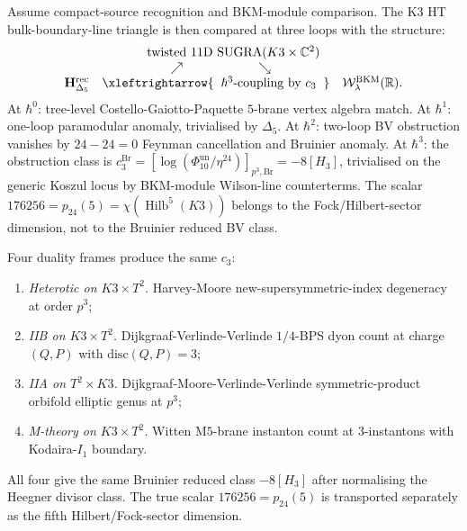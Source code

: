 \begin{remark}
\label{rem:htbb-synthesis}

Assume compact-source recognition and BKM-module comparison. The K3 HT
bulk-boundary-line triangle is then compared at three loops with the
structure:
\[
\begin{array}{c}
 \text{twisted 11D SUGRA}(K3\times\mathbb{C}^2) \\
 \hspace{-2em}\nearrow\qquad\qquad\qquad\searrow \\
 \mathbf{H}_{\Delta_5}^{\mathrm{rec}}
 \quad\xleftrightarrow{\;\;\hbar^3\text{-coupling by }c_3\;\;}\quad
 \mathcal{W}^{\mathrm{BKM}}_\lambda(\mathbb{R}).
\end{array}
\]
At $\hbar^0$: tree-level Costello-Gaiotto-Paquette $5$-brane vertex
algebra match. At $\hbar^1$: one-loop paramodular anomaly,
trivialised by $\Delta_5$. At $\hbar^2$: two-loop BV obstruction
vanishes by $24 - 24 = 0$ Feynman cancellation and Bruinier anomaly.
At $\hbar^3$: the obstruction class is
$c^{\mathrm{Br}}_3
=[\log(\Phi_{10}^{\mathrm{un}}/\eta^{24})]_{p^3,\mathrm{Br}}
=-8[H_3]$, trivialised on the generic Koszul locus by BKM-module
Wilson-line counterterms. The scalar
$176256=p_{24}(5)=\chi(\operatorname{Hilb}^5(K3))$ belongs to the
Fock/Hilbert-sector dimension, not to the Bruinier reduced BV class.

Four duality frames produce the same $c_3$:
\begin{enumerate}[leftmargin=1.8em,label=\textup{(\alph*)}]
\item \emph{Heterotic on $K3\times T^2$.} Harvey-Moore
 new-supersymmetric-index degeneracy at order $p^3$;
\item \emph{IIB on $K3\times T^2$.} Dijkgraaf-Verlinde-Verlinde
 $1/4$-BPS dyon count at charge $(Q, P)$ with
 $\mathrm{disc}(Q, P) = 3$;
\item \emph{IIA on $T^2\times K3$.} Dijkgraaf-Moore-Verlinde-Verlinde
 symmetric-product orbifold elliptic genus at $p^3$;
\item \emph{M-theory on $K3\times T^2$.} Witten M$5$-brane instanton
 count at 3-instantons with Kodaira-$I_1$ boundary.
\end{enumerate}
All four give the same Bruinier reduced class $-8[H_3]$ after
normalising the Heegner divisor class. The true scalar
$176256=p_{24}(5)$ is transported separately as the fifth
Hilbert/Fock-sector dimension.
\end{remark}

